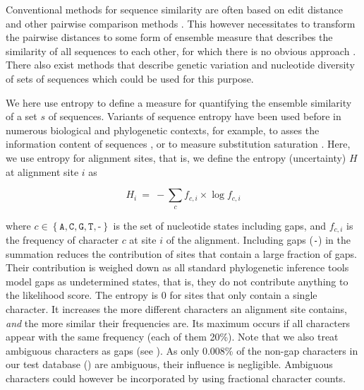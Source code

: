 Conventional methods for sequence similarity are often based on edit distance
and other pairwise comparison methods \cite{Needleman1970,Smith1981,Altschul1990}.
This however necessitates to transform the pairwise distances to some form of ensemble measure
that describes the similarity of all sequences to each other, for which there is no obvious approach \cite{Zhou2006}.
There also exist methods that describe genetic variation and
nucleotide diversity of sets of sequences \cite{Nei1979,Blaisdell1986} which could be used for this purpose.

We here use entropy \cite{Shannon1951} to define a measure
for quantifying the ensemble similarity of a set $s$ of sequences.
Variants of sequence entropy have been used before in numerous biological and phylogenetic contexts,
for example, to asses the information content of sequences
\cite{Schmitt1997,Vinga2003,Vinga2004,Li2005,Criscuolo2010,Comin2012,Vinga2014},
or to measure substitution saturation \cite{Xia2003}.
Here, we use entropy for alignment sites, that is, we define the entropy (uncertainty) $H$ at alignment site $i$ as

\begin{equation}
    \label{ch:AutomaticTrees:eq:entropy}
    H_{i} ~=~ -\sum_c f_{c,i} \times \log f_{c,i}
\end{equation}

where $c \in \left\{ \texttt{A}, \texttt{C}, \texttt{G}, \texttt{T}, \texttt{-} \right\}$ is the set of nucleotide states
including gaps, and $ f_{c,i} $ is the frequency of character $c$ at site $i$ of the alignment.
Including gaps (\texttt{-}) in the summation reduces the contribution of sites that contain a large fraction of gaps.
Their contribution is weighed down as all standard phylogenetic inference tools model gaps as undetermined states,
that is, they do not contribute anything to the likelihood score.
The entropy is \num{0} for sites that only contain a single character.
It increases the more different characters an alignment site contains, {\em and} the more similar their frequencies are.
Its maximum occurs if all characters appear with the same frequency (each of them \num{20}\%).
Note that we also treat ambiguous characters as gaps
(see ).
As only \num{0.008}\% of the non-gap characters in our test database () are ambiguous,
their influence is negligible.
Ambiguous characters could however be incorporated by using fractional character counts.

